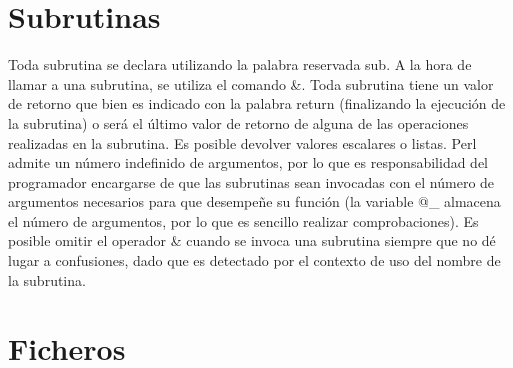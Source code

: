 \documentclass[12pt,a4paper]{memoir}
\begin{document}
	\chapter{Subrutinas}
	Toda subrutina se declara utilizando la palabra reservada sub. A la hora de llamar a una subrutina, se utiliza el comando \&. Toda subrutina tiene un valor de retorno que bien es indicado con la palabra return (finalizando la ejecución de la subrutina) o será el último valor de retorno de alguna de las operaciones realizadas en la subrutina. Es posible devolver valores escalares o listas.\newline
	Perl admite un número indefinido de argumentos, por lo que es responsabilidad del programador encargarse de que las subrutinas sean invocadas con el número de argumentos necesarios para que desempeñe su función (la variable @\_ almacena el número de argumentos, por lo que es sencillo realizar comprobaciones).
	Es posible omitir el operador \& cuando se invoca una subrutina siempre que no dé lugar a confusiones, dado que es detectado por el contexto de uso del nombre de la subrutina.
	
	
	
	\chapter{Ficheros}
\end{document}
